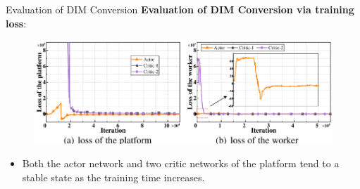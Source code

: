 \documentclass[aspectratio=169,xcolor=dvipsnames]{beamer}
\begin{document}
\begin{frame}[fragile]{Evaluation of DIM Conversion}
    \footnotesize %
    \textbf{Evaluation of DIM Conversion via training loss}: 
\begin{figure}
            \centering
            \includegraphics[width=0.8\linewidth]{DIM_conversion.png}
        \end{figure}        
    \begin{itemize}
        \item Both the actor network and two critic networks of the platform tend to a stable state as the training time increases.
    \end{itemize}
\end{frame}


\end{document}
